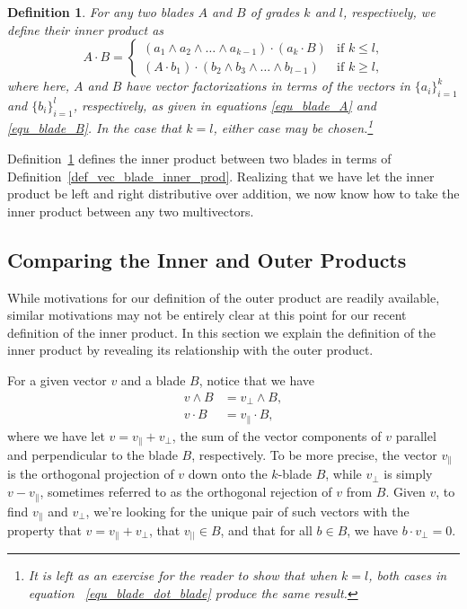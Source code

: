 \documentclass[12pt]{article}
\numberwithin{equation}{section}
\newtheorem{definition}{Definition}[section]
\begin{document}
\begin{definition}\label{def_blade_blade_inner_prod}
For any two blades $A$ and $B$ of grades $k$ and $l$, respectively,
we define their inner product as
\begin{equation}\label{equ_blade_dot_blade}
A\cdot B = \left\{
\begin{array}{ll}
(a_1\wedge a_2\wedge\dots\wedge a_{k-1})\cdot (a_k\cdot B) & \mbox{if $k\leq l$,} \\
(A\cdot b_1)\cdot(b_2\wedge b_3\wedge\dots\wedge b_{l-1}) & \mbox{if $k\geq l$,}
\end{array}
\right.
\end{equation}
where here, $A$ and $B$ have vector factorizations in terms of the
vectors in $\{a_i\}_{i=1}^k$ and $\{b_i\}_{i=1}^l$, respectively,
as given in equations \eqref{equ_blade_A} and \eqref{equ_blade_B}.
In the case that $k=l$, either case may be chosen.\footnote{It is left as
an exercise for the reader to show that when $k=l$, both cases
in equation ~\eqref{equ_blade_dot_blade} produce the same result.}
\end{definition}
Definition~\ref{def_blade_blade_inner_prod} defines the
inner product between two blades in terms of Definition~\ref{def_vec_blade_inner_prod}.
Realizing that we have let the inner product be left and right distributive
over addition, we now know how to take the inner product between
any two multivectors.

\subsection{Comparing the Inner and Outer Products}

While motivations for our definition of the outer product are readily available,
similar motivations may not be entirely clear at this point for our recent
definition of the inner product.  In this section we explain the
definition of the inner product by revealing its relationship with
the outer product.

For a given vector $v$ and a blade $B$, notice
that we have
\begin{align}
v\wedge B &= v_{\perp}\wedge B, \label{equ_v_op_B}\\
v\cdot B &= v_{\parallel}\cdot B,\label{equ_v_ip_B}
\end{align}
where we have let $v=v_{\parallel}+v_{\perp}$, the
sum of the vector components of $v$ parallel and
perpendicular to the blade $B$, respectively.  To be more precise,
the vector $v_{\parallel}$ is the orthogonal projection of $v$ down
onto the $k$-blade $B$, while $v_{\perp}$ is simply $v-v_{\parallel}$,
sometimes referred to as the orthogonal rejection of $v$ from $B$.
Given $v$, to find $v_{\parallel}$ and $v_{\perp}$, we're looking for
the unique pair of such vectors with the property that $v=v_{\parallel}+v_{\perp}$,
that $v_{||}\in B$, and that for all $b\in B$, we have $b\cdot v_{\perp}=0$.
\end{document}
